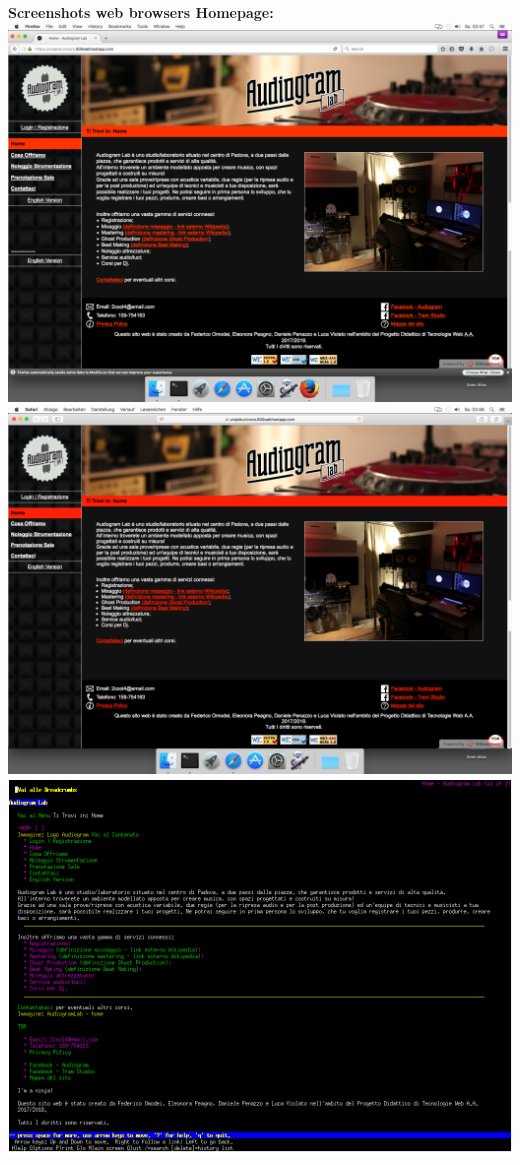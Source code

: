 \pagebreak

\begin{center}
\textbf{Screenshots web browsers Homepage: }
\vfill
\includegraphics[scale=0.7]{Images/Firefox45.png}
\vfill
\includegraphics[scale=0.7]{Images/Safari913MacOSX108.png}
\vfill
\includegraphics[scale=0.7]{Images/Lynx288Ubuntu1204LTS.png}

\end{center}
